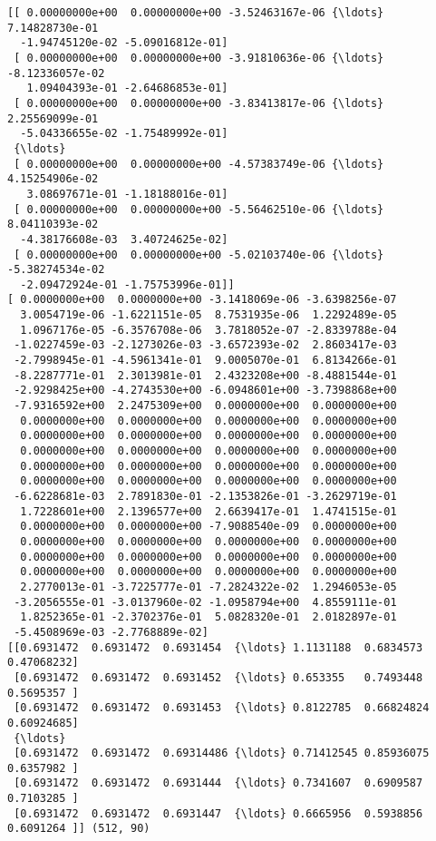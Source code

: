 \documentclass[11pt]{article}
\begin{document}
    \begin{Verbatim}[commandchars=\\\{\}]
[[ 0.00000000e+00  0.00000000e+00 -3.52463167e-06 {\ldots}  7.14828730e-01
  -1.94745120e-02 -5.09016812e-01]
 [ 0.00000000e+00  0.00000000e+00 -3.91810636e-06 {\ldots} -8.12336057e-02
   1.09404393e-01 -2.64686853e-01]
 [ 0.00000000e+00  0.00000000e+00 -3.83413817e-06 {\ldots}  2.25569099e-01
  -5.04336655e-02 -1.75489992e-01]
 {\ldots}
 [ 0.00000000e+00  0.00000000e+00 -4.57383749e-06 {\ldots}  4.15254906e-02
   3.08697671e-01 -1.18188016e-01]
 [ 0.00000000e+00  0.00000000e+00 -5.56462510e-06 {\ldots}  8.04110393e-02
  -4.38176608e-03  3.40724625e-02]
 [ 0.00000000e+00  0.00000000e+00 -5.02103740e-06 {\ldots} -5.38274534e-02
  -2.09472924e-01 -1.75753996e-01]]
[ 0.0000000e+00  0.0000000e+00 -3.1418069e-06 -3.6398256e-07
  3.0054719e-06 -1.6221151e-05  8.7531935e-06  1.2292489e-05
  1.0967176e-05 -6.3576708e-06  3.7818052e-07 -2.8339788e-04
 -1.0227459e-03 -2.1273026e-03 -3.6572393e-02  2.8603417e-03
 -2.7998945e-01 -4.5961341e-01  9.0005070e-01  6.8134266e-01
 -8.2287771e-01  2.3013981e-01  2.4323208e+00 -8.4881544e-01
 -2.9298425e+00 -4.2743530e+00 -6.0948601e+00 -3.7398868e+00
 -7.9316592e+00  2.2475309e+00  0.0000000e+00  0.0000000e+00
  0.0000000e+00  0.0000000e+00  0.0000000e+00  0.0000000e+00
  0.0000000e+00  0.0000000e+00  0.0000000e+00  0.0000000e+00
  0.0000000e+00  0.0000000e+00  0.0000000e+00  0.0000000e+00
  0.0000000e+00  0.0000000e+00  0.0000000e+00  0.0000000e+00
  0.0000000e+00  0.0000000e+00  0.0000000e+00  0.0000000e+00
 -6.6228681e-03  2.7891830e-01 -2.1353826e-01 -3.2629719e-01
  1.7228601e+00  2.1396577e+00  2.6639417e-01  1.4741515e-01
  0.0000000e+00  0.0000000e+00 -7.9088540e-09  0.0000000e+00
  0.0000000e+00  0.0000000e+00  0.0000000e+00  0.0000000e+00
  0.0000000e+00  0.0000000e+00  0.0000000e+00  0.0000000e+00
  0.0000000e+00  0.0000000e+00  0.0000000e+00  0.0000000e+00
  2.2770013e-01 -3.7225777e-01 -7.2824322e-02  1.2946053e-05
 -3.2056555e-01 -3.0137960e-02 -1.0958794e+00  4.8559111e-01
  1.8252365e-01 -2.3702376e-01  5.0828320e-01  2.0182897e-01
 -5.4508969e-03 -2.7768889e-02]
[[0.6931472  0.6931472  0.6931454  {\ldots} 1.1131188  0.6834573  0.47068232]
 [0.6931472  0.6931472  0.6931452  {\ldots} 0.653355   0.7493448  0.5695357 ]
 [0.6931472  0.6931472  0.6931453  {\ldots} 0.8122785  0.66824824 0.60924685]
 {\ldots}
 [0.6931472  0.6931472  0.69314486 {\ldots} 0.71412545 0.85936075 0.6357982 ]
 [0.6931472  0.6931472  0.6931444  {\ldots} 0.7341607  0.6909587  0.7103285 ]
 [0.6931472  0.6931472  0.6931447  {\ldots} 0.6665956  0.5938856  0.6091264 ]] (512, 90)

    \end{Verbatim}
\end{document}

